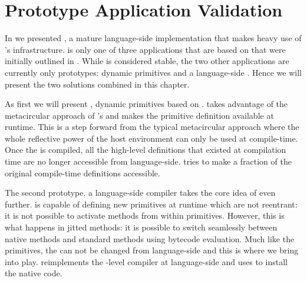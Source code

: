 

\chapter{\B Prototype Application Validation}
\minitoc
\introduction


In  we presented \NB, a mature language-side \FFI implementation that makes heavy use of \B's infrastructure.
\NB is only one of three applications that are based on \B that were initially outlined in .
While \NB is considered stable, the two other applications are currently only prototypes: dynamic primitives and a language-side \JIT.
Hence we will present the two solutions combined in this chapter.

As first we will present \WF {}, dynamic primitives based on \B.
\WF takes advantage of the metacircular approach of \PH's \VM and makes the primitive definition available at runtime.
This is a step forward from the typical metacircular approach where the whole reflective power of the host environment can only be used at compile-time.
Once the \VM is compiled, all the high-level definitions that existed at compilation time are no longer accessible from language-side.
\WF tries to make a fraction of the original compile-time definitions accessible.

\enlargethispage{\baselineskip}
The second prototype, \NBJ a language-side \JIT compiler takes the core idea of \WF even further.
\WF is capable of defining new primitives at runtime which are not reentrant: it is not possible to activate \PH methods from within primitives.
However, this is what happens in jitted methods: it is possible to switch seamlessly between native methods and standard \PH methods using bytecode evaluation.
Much like the primitives, the \JIT can not be changed from language-side and this is where we bring \NBJ into play.
\NBJ reimplements the \VM-level \JIT compiler at language-side and uses \B to install the native code.


